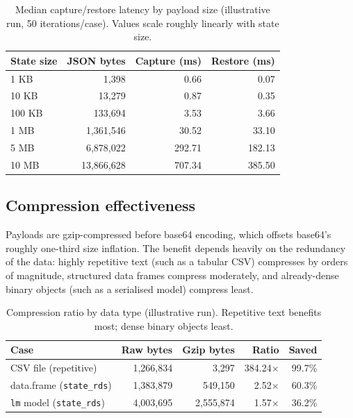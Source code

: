 \documentclass[11pt,a4paper]{article}
\begin{document}
\begin{table}[h]
\centering
\begin{tabular}{lrrr}
\toprule
\textbf{State size} & \textbf{JSON bytes} & \textbf{Capture (ms)} & \textbf{Restore (ms)} \\
\midrule
1 KB    & 1{,}398      & 0.66  & 0.07  \\
10 KB   & 13{,}279     & 0.87  & 0.35  \\
100 KB  & 133{,}694    & 3.53  & 3.66  \\
1 MB    & 1{,}361{,}546  & 30.52 & 33.10 \\
5 MB    & 6{,}878{,}022  & 292.71 & 182.13 \\
10 MB   & 13{,}866{,}628 & 707.34 & 385.50 \\
\bottomrule
\end{tabular}
\caption{Median capture/restore latency by payload size (illustrative run,
50 iterations/case). Values scale roughly linearly with state size.}
\label{tab:bench-latency}
\end{table}

\subsection{Compression effectiveness}

Payloads are gzip-compressed before base64 encoding, which offsets base64's
roughly one-third size inflation. The benefit depends heavily on the
redundancy of the data: highly repetitive text (such as a tabular CSV) compresses
by orders of magnitude, structured data frames compress moderately, and
already-dense binary objects (such as a serialised model) compress least.

\begin{table}[h]
\centering
\begin{tabular}{lrrrr}
\toprule
\textbf{Case} & \textbf{Raw bytes} & \textbf{Gzip bytes} & \textbf{Ratio} & \textbf{Saved} \\
\midrule
CSV file (repetitive)   & 1{,}266{,}834 & 3{,}297     & 384.24$\times$ & 99.7\% \\
data.frame (\texttt{state\_rds}) & 1{,}383{,}879 & 549{,}150 & 2.52$\times$ & 60.3\% \\
\texttt{lm} model (\texttt{state\_rds}) & 4{,}003{,}695 & 2{,}555{,}874 & 1.57$\times$ & 36.2\% \\
\bottomrule
\end{tabular}
\caption{Compression ratio by data type (illustrative run). Repetitive text
benefits most; dense binary objects least.}
\label{tab:bench-compression}
\end{table}
\end{document}
